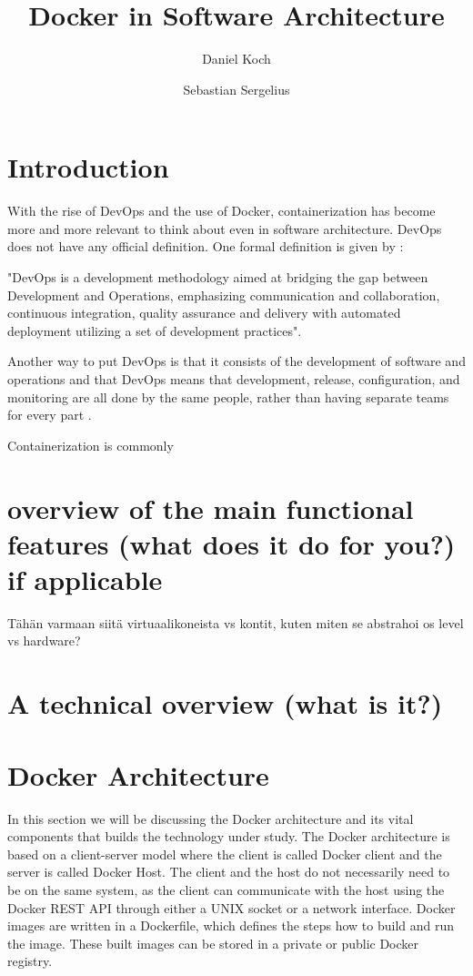 \documentclass[fleqn,12pt]{olplainarticle}
\title{Docker in Software Architecture}
\author[1]{Daniel Koch}
\author[2]{Sebastian Sergelius}
\affil[1]{daniel.koch@helsinki.fi}
\affil[2]{github.com/sebazai}
\begin{document}
\flushbottom
\maketitle
\thispagestyle{empty}

\section*{Introduction}

With the rise of DevOps and the use of Docker, containerization has become more and more relevant to think about even
in software architecture. DevOps does not have any official definition.
One formal definition is given by \cite{Jabbari_devops}: 
\begin{displayquote}
"DevOps is a development methodology aimed at bridging the gap between Development and Operations, emphasizing communication and collaboration, continuous integration, quality assurance and delivery with automated deployment utilizing a set of development practices".
\end{displayquote}
Another way to put DevOps is that it consists of the development of software and operations and that DevOps means that development, release, configuration, and monitoring are all done by the same people, rather than having separate teams for every part \citep{hy:DevOps_with_Docker}.

Containerization is commonly


\section*{overview of the main functional features (what does it do for you?) if applicable}

Tähän varmaan siitä virtuaalikoneista vs kontit, kuten miten se abstrahoi os level vs hardware?

\section*{A technical overview (what is it?)}

\section*{Docker Architecture}

In this section we will be discussing the Docker architecture and its vital components that builds the technology under study. The Docker architecture is based on a client-server model where the client is called Docker client and the server is called Docker Host\cite{docker:overview, aquasec:docker_architecture}. The client and the host do not necessarily need to be on the same system, as the client can communicate with the host using the Docker REST API through either a UNIX socket or a network interface. Docker images are written in a Dockerfile, which defines the steps how to build and run the image. These built images can be stored in a private or public Docker registry.
\end{document}
